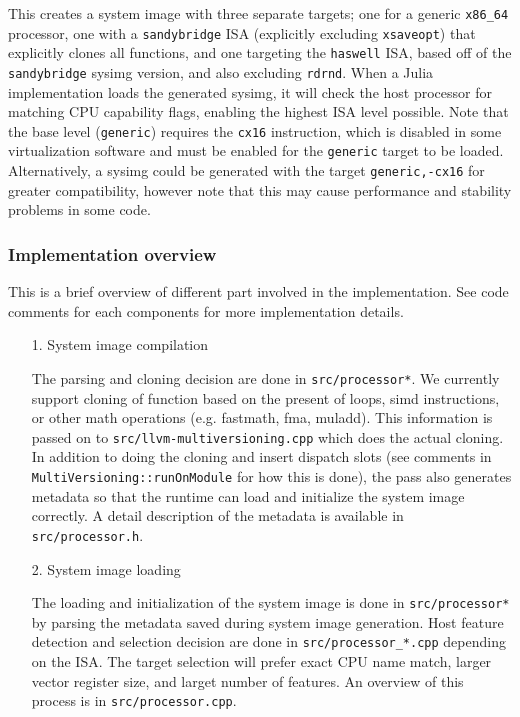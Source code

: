 This creates a system image with three separate targets; one for a generic \texttt{x86\_64} processor, one with a \texttt{sandybridge} ISA (explicitly excluding \texttt{xsaveopt}) that explicitly clones all functions, and one targeting the \texttt{haswell} ISA, based off of the \texttt{sandybridge} sysimg version, and also excluding \texttt{rdrnd}.  When a Julia implementation loads the generated sysimg, it will check the host processor for matching CPU capability flags, enabling the highest ISA level possible.  Note that the base level (\texttt{generic}) requires the \texttt{cx16} instruction, which is disabled in some virtualization software and must be enabled for the \texttt{generic} target to be loaded.  Alternatively, a sysimg could be generated with the target \texttt{generic,-cx16} for greater compatibility, however note that this may cause performance and stability problems in some code.



\hypertarget{6161913736473072394}{}


\subsubsection{Implementation overview}



This is a brief overview of different part involved in the implementation. See code comments for each components for more implementation details.



\begin{itemize}
\item[1. ] System image compilation

The parsing and cloning decision are done in \texttt{src/processor*}.  We currently support cloning of function based on the present of loops, simd instructions,  or other math operations (e.g. fastmath, fma, muladd).  This information is passed on to \texttt{src/llvm-multiversioning.cpp} which does the actual cloning.  In addition to doing the cloning and insert dispatch slots  (see comments in \texttt{MultiVersioning::runOnModule} for how this is done),  the pass also generates metadata so that the runtime can load and initialize the  system image correctly.  A detail description of the metadata is available in \texttt{src/processor.h}.


\item[2. ] System image loading

The loading and initialization of the system image is done in \texttt{src/processor*} by  parsing the metadata saved during system image generation.  Host feature detection and selection decision are done in \texttt{src/processor\_*.cpp}  depending on the ISA. The target selection will prefer exact CPU name match,  larger vector register size, and larget number of features.  An overview of this process is in \texttt{src/processor.cpp}.

\end{itemize}


